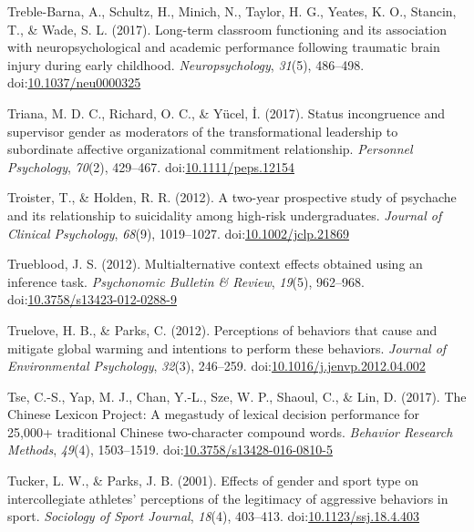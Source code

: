 \documentclass[english,man]{apa6}
\theoremstyle{definition}
\theoremstyle{definition}
\theoremstyle{definition}
\theoremstyle{remark}
\begin{document}
\hypertarget{ref-Treble-barna2017}{}
Treble-Barna, A., Schultz, H., Minich, N., Taylor, H. G., Yeates, K. O.,
Stancin, T., \& Wade, S. L. (2017). Long-term classroom functioning and
its association with neuropsychological and academic performance
following traumatic brain injury during early childhood.
\emph{Neuropsychology}, \emph{31}(5), 486--498.
doi:\href{https://doi.org/10.1037/neu0000325}{10.1037/neu0000325}

\hypertarget{ref-Triana2017}{}
Triana, M. D. C., Richard, O. C., \& Yücel, İ. (2017). Status
incongruence and supervisor gender as moderators of the transformational
leadership to subordinate affective organizational commitment
relationship. \emph{Personnel Psychology}, \emph{70}(2), 429--467.
doi:\href{https://doi.org/10.1111/peps.12154}{10.1111/peps.12154}

\hypertarget{ref-Troister2012}{}
Troister, T., \& Holden, R. R. (2012). A two-year prospective study of
psychache and its relationship to suicidality among high-risk
undergraduates. \emph{Journal of Clinical Psychology}, \emph{68}(9),
1019--1027.
doi:\href{https://doi.org/10.1002/jclp.21869}{10.1002/jclp.21869}

\hypertarget{ref-Trueblood2012}{}
Trueblood, J. S. (2012). Multialternative context effects obtained using
an inference task. \emph{Psychonomic Bulletin \& Review}, \emph{19}(5),
962--968.
doi:\href{https://doi.org/10.3758/s13423-012-0288-9}{10.3758/s13423-012-0288-9}

\hypertarget{ref-Truelove2012}{}
Truelove, H. B., \& Parks, C. (2012). Perceptions of behaviors that
cause and mitigate global warming and intentions to perform these
behaviors. \emph{Journal of Environmental Psychology}, \emph{32}(3),
246--259.
doi:\href{https://doi.org/10.1016/j.jenvp.2012.04.002}{10.1016/j.jenvp.2012.04.002}

\hypertarget{ref-Tse2017}{}
Tse, C.-S., Yap, M. J., Chan, Y.-L., Sze, W. P., Shaoul, C., \& Lin, D.
(2017). The Chinese Lexicon Project: A megastudy of lexical decision
performance for 25,000+ traditional Chinese two-character compound
words. \emph{Behavior Research Methods}, \emph{49}(4), 1503--1519.
doi:\href{https://doi.org/10.3758/s13428-016-0810-5}{10.3758/s13428-016-0810-5}

\hypertarget{ref-Tucker2001}{}
Tucker, L. W., \& Parks, J. B. (2001). Effects of gender and sport type
on intercollegiate athletes' perceptions of the legitimacy of aggressive
behaviors in sport. \emph{Sociology of Sport Journal}, \emph{18}(4),
403--413.
doi:\href{https://doi.org/10.1123/ssj.18.4.403}{10.1123/ssj.18.4.403}
\end{document}

